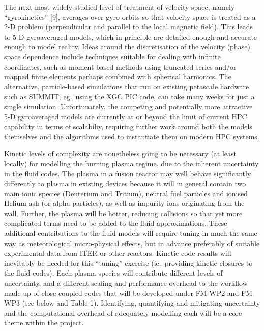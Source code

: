 The next most widely studied level of treatment of velocity space,  namely 
``gyrokinetics'' [9], averages over gyro-orbits so that velocity space is treated 
as a 2-D problem (perpendicular and parallel to the local magnetic field). This 
leads to 5-D gyroaveraged models, which in principle are detailed enough and accurate 
enough to model reality. Ideas around the discretisation of the velocity (phase) 
space dependence include techniques suitable for dealing with infinite coordinates, 
such as moment-based methods using truncated series and/or mapped finite elements 
perhaps combined with spherical harmonics. The alternative, particle-based simulations 
that run on existing petascale hardware such as SUMMIT, eg.\ using the XGC PIC 
code, can take many weeks for just a single simulation. Unfortunately, the competing 
and potentially more attractive 5-D gyroaveraged models are currently at or beyond 
the limit of current HPC capability in terms of scalabiliy, requiring further work 
around both the models themselves and the algorithms used to instantiate them on 
modern HPC systems.

Kinetic levels of complexity are nonetheless going to be necessary (at least locally) 
for modelling the burning plasma regime, due to the inherent uncertainty in the 
fluid codes. The plasma in a fusion reactor may well behave significantly differently 
to plasma in existing devices because it will in general contain two main ionic 
species (Deuterium and Tritium), neutral fuel particles and ionised Helium ash 
(or alpha particles), as well as impurity ions originating from the wall. Further, 
the plasma will be hotter, reducing collisions so that yet more complicated terms 
need to be added to the fluid approximations. These additional contributions to 
the fluid models will require tuning in much the same way as meteorological micro-physical 
effects, but in advance preferably of suitable experimental data from ITER or other 
reactors. Kinetic code results will inevitably be needed for this ``tuning'' exercise 
(ie.\ providing kinetic closures to the fluid codes). Each plasma species will 
contribute different levels of uncertainty, and a different scaling and performance 
overhead to the workflow made up of close coupled codes that will be developed 
under FM-WP2 and FM-WP3 (see below and Table 1). Identifying, quantifying and mitigating 
uncertainty and the computational overhead of adequately modelling each will be 
a core theme within the project.


